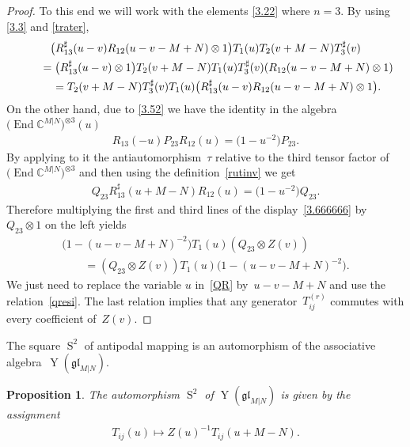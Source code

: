 \documentclass[10pt,a4paper]{amsart}
\numberwithin{equation}{section}
\newtheorem{Proposition}[Theorem]{Proposition}
\def\CC{{\mathbb{C}}}
\def\CMN{\CC^{M|N}}
\def\End{\operatorname{End}}
\def\glMN{\mathfrak{gl}_{M|N}}
\def\ot{\otimes}
\def\RS{R^{\sharp}}
\def\S{\operatorname{S}}
\def\TS{T^{\sharp}}
\def\YMN{\operatorname{Y}(\glMN)}
\begin{document}
\begin{proof}
To this end we will work with the elements \eqref{3.22}
where $n=3 $. By using \eqref{3.3} and \eqref{trater},
\begin{gather}
\big(\RS_{13}(u-v) R_{12}(u-v-M+N)\ot1\big)
T_1(u) T_2(v+M-N) \TS_3(v)
\notag
\\
\qquad{}=\big(\RS_{13}(u-v)\ot1\big)
T_2(v+M-N) T_1(u) \TS_3(v)
(R_{12}(u-v-M+N)\ot1)
\notag
\\
\qquad{} =T_2(v+M-N) \TS_3(v) T_1(u)
\big(\RS_{13}(u-v) R_{12}(u-v-M+N)\ot1\big) .\label{3.666666}
\end{gather}
On the other hand, due to \eqref{3.52} we have the identity in the algebra
$\big(\End\CMN\big)^{\ot 3}( u )$
\begin{gather*}
R_{13}(-u) P_{23} R_{12}(u)=\big( 1-u^{-2} \big) P_{23} .
\end{gather*}
By applying to it the antiautomorphism~$\tau$
relative to the third tensor factor of $\big(\End\CMN\big)^{\ot 3}$
and then using the definition~\eqref{rutinv} we get
\begin{gather}\label{QR}
Q_{23} \RS_{13}(u+M-N) R_{12}(u)=\big( 1-u^{-2} \big) Q_{23} .
\end{gather}
Therefore multiplying the first and third lines of the display~\eqref{3.666666} by $Q_{23}\ot1$ on the left yields
\begin{gather*}
\big( 1-(u-v-M+N)^{-2} \big)
T_1(u) (Q_{23}\ot Z(v))\\
\qquad{} = (Q_{23}\ot Z(v)) T_1(u)\big( 1-(u-v-M+N)^{-2} \big) .
\end{gather*}
We just need to replace the variable $u$ in~\eqref{QR} by~$u-v-M+N$
and use the relation~\eqref{qresi}.
The last relation implies that any generator~$T_{ij}^{(r)}$
commutes with every coefficient of~$Z(v)$.
\end{proof}

The square $\S^{2}$ of antipodal mapping is an automorphism of the associative algebra~$\YMN $.

\begin{Proposition}\label{ss}
The automorphism $\S^{2}$ of $\YMN$ is given by the assignment
\begin{gather*}
T_{ij}(u)\mapsto Z(u)^{-1} T_{ij}(u+M-N) .
\end{gather*}
\end{Proposition}
\end{document}
